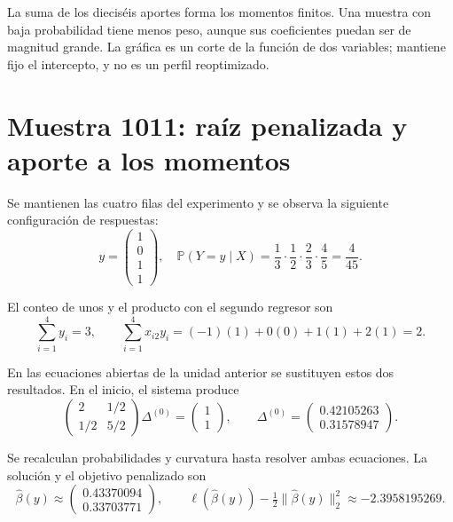 \documentclass[11pt,a4paper]{article}
\newcommand{\Prob}{\mathbb P}
\begin{document}
La suma de los dieciséis aportes forma los momentos finitos.
Una muestra con baja probabilidad tiene menos peso,
aunque sus coeficientes puedan ser de magnitud grande.
La gráfica es un corte de la función de dos variables;
mantiene fijo el intercepto, y no es un perfil reoptimizado.
\endgroup

\clearpage
\section{Muestra 1011: raíz penalizada y aporte a los momentos}\label{logit136}
\begingroup\small
\setlength{\abovedisplayskip}{4pt}\setlength{\belowdisplayskip}{4pt}
Se mantienen las cuatro filas del experimento y se observa
la siguiente configuración de respuestas:
\[
y=\begin{pmatrix}1\\0\\1\\1\end{pmatrix},\quad \Prob(Y=y\mid X)=\frac{1}{3}\cdot\frac{1}{2}\cdot\frac{2}{3}\cdot\frac{4}{5}=\frac{4}{45}.
\]

El conteo de unos y el producto con el segundo regresor son
\[
\sum_{i=1}^4 y_i=3,\qquad\sum_{i=1}^4x_{i2}y_i=(-1)(1)+0(0)+1(1)+2(1)=2.
\]

En las ecuaciones abiertas de la unidad anterior se sustituyen
estos dos resultados. En el inicio, el sistema produce
\[
\begin{pmatrix}2&1/2\\1/2&5/2\end{pmatrix}\Delta^{(0)}=\begin{pmatrix}1\\1\end{pmatrix},\qquad\Delta^{(0)}=\begin{pmatrix}0.42105263\\0.31578947\end{pmatrix}.
\]

Se recalculan probabilidades y curvatura hasta resolver
ambas ecuaciones. La solución y el objetivo penalizado son
\[
\widehat\beta(y)\approx\begin{pmatrix}0.43370094\\0.33703771\end{pmatrix},\qquad \ell(\widehat\beta(y))-\tfrac12\|\widehat\beta(y)\|_2^2\approx-2.3958195269.
\]
\end{document}
